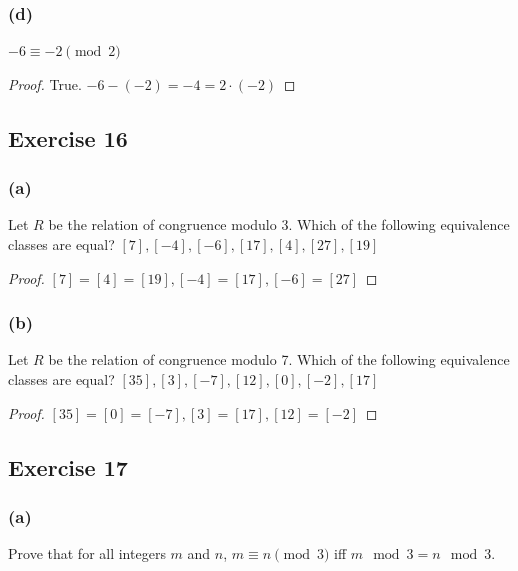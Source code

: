 \documentclass[14pt]{extarticle}
\begin{document}
\subsubsection{(d)}
\(-6 \equiv -2 \pmod 2\)
\begin{proof}
True. \(-6 - (-2) = -4 = 2 \cdot (-2)\)
\end{proof}

\subsection{Exercise 16}
\subsubsection{(a)}
Let \(R\) be the relation of congruence modulo 3. Which of the following equivalence classes are equal? 
\([7], [-4], [-6], [17], [4], [27], [19]\)

\begin{proof}
\([7] = [4] = [19], [-4] = [17], [-6] = [27]\)
\end{proof}

\subsubsection{(b)}
Let \(R\) be the relation of congruence modulo 7. Which of the following equivalence classes are equal?
\([35], [3], [-7], [12], [0], [-2], [17]\)

\begin{proof}
\([35] = [0] = [-7], [3] = [17], [12] = [-2]\)
\end{proof}

\subsection{Exercise 17}
\subsubsection{(a)}
Prove that for all integers $m$ and $n$, \(m \equiv n \pmod 3\) iff \(m \mod 3 = n \mod 3\).
\end{document}

